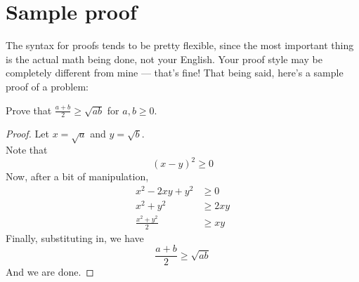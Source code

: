 \documentclass[a4paper]{scrartcl}
\begin{document}
	\section{Sample proof}
	The syntax for proofs tends to be pretty flexible, since the most important thing is the actual math being done, not your English. Your proof style may be completely different from mine --- that's fine!
	That being said, here's a sample proof of a problem:
	\begin{problem*}
		Prove that $\frac{a + b}{2} \geq \sqrt{ab}$ for $a,b \geq 0$.
	\end{problem*}
	\begin{proof}
		Let $x=\sqrt{a}$ and $y=\sqrt{b}$. \\
		Note that 
		\[(x-y)^2 \geq 0\]
		Now, after a bit of manipulation,
		\begin{align*}
			x^2 - 2xy + y^2 &\geq 0 \\
			x^2 + y^2 &\geq 2xy \\
			\frac{x^2+y^2}{2} &\geq xy
		\end{align*}
		Finally, substituting in, we have 
		\[\frac{a+b}{2} \geq \sqrt{ab}\]
		And we are done.
	\end{proof}
\end{document}
